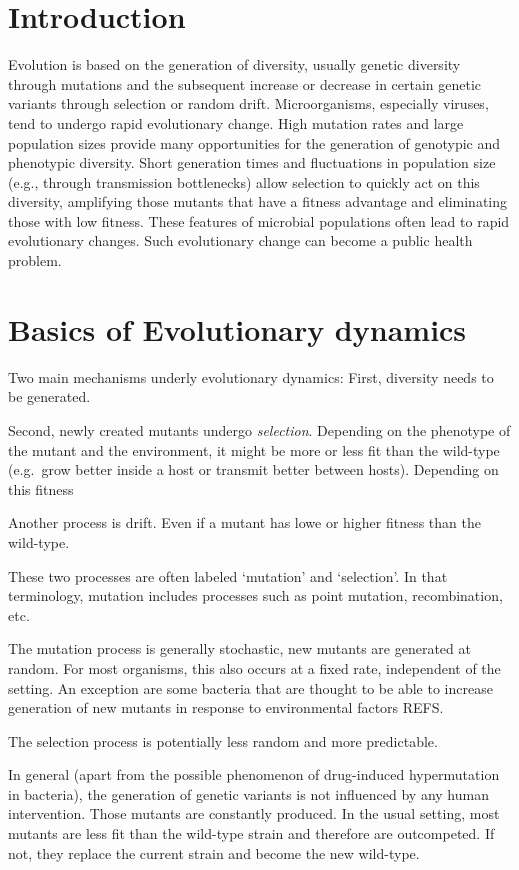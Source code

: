 \documentclass[]{book}
\theoremstyle{definition}
\theoremstyle{definition}
\theoremstyle{definition}
\theoremstyle{remark}
\begin{document}
\section{Introduction}\label{introduction-13}

Evolution is based on the generation of diversity, usually genetic
diversity through mutations and the subsequent increase or decrease in
certain genetic variants through selection or random drift.
Microorganisms, especially viruses, tend to undergo rapid evolutionary
change. High mutation rates and large population sizes provide many
opportunities for the generation of genotypic and phenotypic diversity.
Short generation times and fluctuations in population size (e.g.,
through transmission bottlenecks) allow selection to quickly act on this
diversity, amplifying those mutants that have a fitness advantage and
eliminating those with low fitness. These features of microbial
populations often lead to rapid evolutionary changes. Such evolutionary
change can become a public health problem.

\section{Basics of Evolutionary
dynamics}\label{basics-of-evolutionary-dynamics}

Two main mechanisms underly evolutionary dynamics: First, diversity
needs to be generated.

Second, newly created mutants undergo \emph{selection}. Depending on the
phenotype of the mutant and the environment, it might be more or less
fit than the wild-type (e.g.~grow better inside a host or transmit
better between hosts). Depending on this fitness

Another process is drift. Even if a mutant has lowe or higher fitness
than the wild-type.

These two processes are often labeled `mutation' and `selection'. In
that terminology, mutation includes processes such as point mutation,
recombination, etc.

The mutation process is generally stochastic, new mutants are generated
at random. For most organisms, this also occurs at a fixed rate,
independent of the setting. An exception are some bacteria that are
thought to be able to increase generation of new mutants in response to
environmental factors REFS.

The selection process is potentially less random and more predictable.

In general (apart from the possible phenomenon of drug-induced
hypermutation in bacteria), the generation of genetic variants is not
influenced by any human intervention. Those mutants are constantly
produced. In the usual setting, most mutants are less fit than the
wild-type strain and therefore are outcompeted. If not, they replace the
current strain and become the new wild-type.
\end{document}

